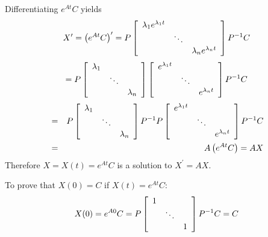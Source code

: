 Differentiating $e^{At}C$ yields
\begin{equation*}
X^{\prime} = \left( e^{At}C\right) ^{\prime }=P\left[ 
\begin{array}{ccc}
\lambda _{1}e^{\lambda _{1}t} &  &  \\ 
& \ddots &  \\ 
&  & \lambda _{n}e^{\lambda _{n}t}
\end{array}
\right] P^{-1}C
\end{equation*}
\begin{equation*}
=P\left[ 
\begin{array}{ccc}
\lambda _{1} &  &  \\ 
& \ddots &  \\ 
&  & \lambda _{n}
\end{array}
\right] \left[ 
\begin{array}{ccc}
e^{\lambda _{1}t} &  &  \\ 
& \ddots &  \\ 
&  & e^{\lambda _{n}t}
\end{array}
\right] P^{-1}C
\end{equation*}
\begin{eqnarray*}
&=&P\left[ 
\begin{array}{ccc}
\lambda _{1} &  &  \\ 
& \ddots &  \\ 
&  & \lambda _{n}
\end{array}
\right] P^{-1}P\left[ 
\begin{array}{ccc}
e^{\lambda _{1}t} &  &  \\ 
& \ddots &  \\ 
&  & e^{\lambda _{n}t}
\end{array}
\right] P^{-1}C \\
&=&A\left( e^{At}C\right) = AX
\end{eqnarray*}
Therefore $X = X(t) = e^{At}C$ is a solution to $X^{\prime }=AX$. 

To prove that $X(0) =  C$ if $X(t) = e^{At}C$:
\begin{equation*}
X(0) = e^{A0}C=P\left[ 
\begin{array}{ccc}
1 &  &  \\ 
& \ddots &  \\ 
&  & 1
\end{array}
\right] P^{-1}C=C
\end{equation*}


